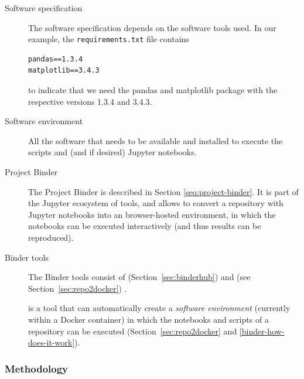 \begin{description}
\item[Software specification] The software specification depends on the software
  tools used. In our example, the \texttt{requirements.txt} file contains
\begin{verbatim}
pandas==1.3.4
matplotlib==3.4.3
\end{verbatim}
to indicate that we need the pandas and matplotlib package with the respective
versions 1.3.4 and 3.4.3.

\item[Software environment] All the software that needs to be available and
  installed to execute the scripts and (and if desired) Jupyter notebooks.

\item[Project Binder] The Project Binder is described in Section
\ref{seq:project-binder}. It is part of the Jupyter ecosystem of tools, and
allows to convert a repository with Jupyter notebooks into an browser-hosted
environment, in which the notebooks can be executed interactively (and thus
results can be reproduced). 

\item[Binder tools] The Binder tools consist of \binderhub{}
  (Section~\ref{sec:binderhub}) and \repotodocker{} (see
  Section~\ref{sec:repo2docker}) . 

\item[\repotodocker] \repotodocker{} is a tool that can automatically create a
\emph{software environment} (currently within a Docker container) in which the
notebooks and scripts of a repository can be executed 
(Section~\ref{sec:repo2docker} and \ref{binder-how-does-it-work}).
\end{description}




% 

\subsubsection{Methodology}\label{sec:methodology}

